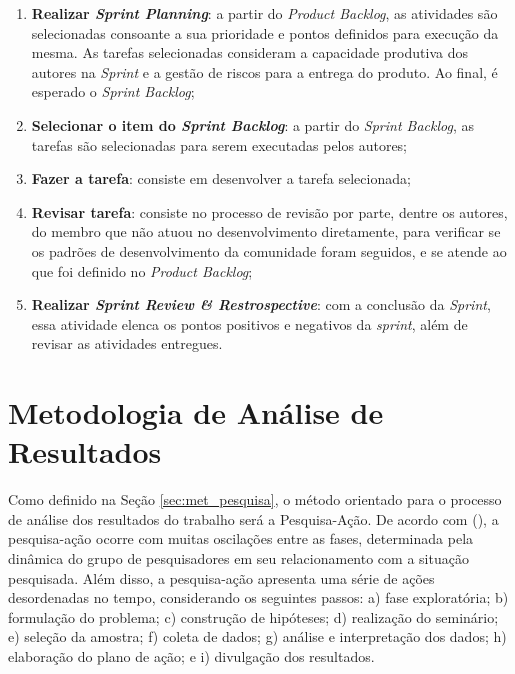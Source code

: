 \begin{enumerate}
    \item \textbf{Realizar \textit{Sprint Planning}}: a partir do \textit{Product Backlog}, as atividades são selecionadas consoante a sua prioridade e pontos definidos para execução da mesma. As tarefas selecionadas consideram a capacidade produtiva dos autores na \textit{Sprint} e a gestão de riscos para a entrega do produto. Ao final, é esperado o \textit{Sprint Backlog};
    \item \textbf{Selecionar o item do \textit{Sprint Backlog}}: a partir do \textit{Sprint Backlog}, as tarefas são selecionadas para serem executadas pelos autores;
    \item \textbf{Fazer a tarefa}: consiste em desenvolver a tarefa selecionada;
    \item \textbf{Revisar tarefa}: consiste no processo de revisão por parte, dentre os autores, do membro que não atuou no desenvolvimento diretamente, para verificar se os padrões de desenvolvimento da comunidade foram seguidos, e se atende ao que foi definido no \textit{Product Backlog};
    \item \textbf{Realizar \textit{Sprint Review \& Restrospective}}: com a conclusão da \textit{Sprint}, essa atividade elenca os pontos positivos e negativos da \textit{sprint}, além de revisar as atividades entregues.
\end{enumerate}


\section{Metodologia de Análise de Resultados}

\label{sec:meto_analise_resultado}

Como definido na Seção \ref{sec:met_pesquisa}, o método orientado para o processo de análise dos resultados do trabalho será a Pesquisa-Ação. De acordo com  (\citeyear{gil2002elaborar}), a pesquisa-ação ocorre com muitas oscilações entre as fases, determinada pela dinâmica do grupo de pesquisadores em seu relacionamento com a situação pesquisada. Além disso, a pesquisa-ação apresenta uma série de ações desordenadas no tempo, considerando os seguintes passos: a) fase exploratória; b) formulação do problema; c) construção de hipóteses; d) realização do seminário; e) seleção da amostra; f) coleta de dados; g) análise e interpretação dos dados; h) elaboração do plano de ação; e i) divulgação dos resultados.

